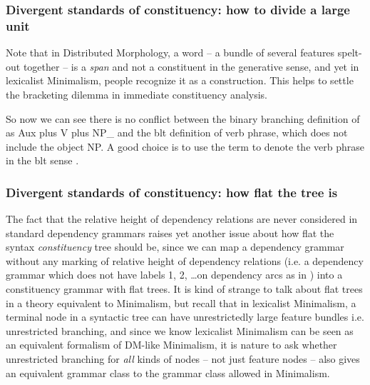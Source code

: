 \documentclass[../main.tex]{subfiles}
\begin{document}
\subsubsection{Divergent standards of constituency: how to divide a large unit}\label{sec:divergent-standard-constituency-segmentation}

Note that in Distributed Morphology, a word -- a bundle of several features spelt-out together -- 
is a \emph{span} and not a constituent in the generative sense, 
and yet in lexicalist Minimalism, people recognize it as a construction. 
This helps to settle the bracketing dilemma in immediate constituency analysis.

So now we can see there is no conflict 
between the binary branching definition of  as Aux plus V plus NP_{} 
and the \ac{blt} definition of verb phrase, which does not include the object NP. 
A good choice is to use the term  
to denote the verb phrase in the \ac{blt} sense \citep[among others]{Wilbur2014,Friesen2017}.

\subsubsection{Divergent standards of constituency: how flat the tree is}

The fact that the relative height of dependency relations are never considered 
in standard dependency grammars raises yet another issue about 
how flat the syntax \emph{constituency} tree should be,
since we can map a dependency grammar without any marking of relative height of dependency relations 
(i.e. a dependency grammar which does not have labels 1, 2, \dots on dependency arcs as in )
into a constituency grammar with flat trees. 
It is kind of strange to talk about flat trees in a theory equivalent to Minimalism, 
but recall that in lexicalist Minimalism, 
a terminal node in a syntactic tree can have unrestrictedly large feature bundles i.e. unrestricted branching, 
and since we know lexicalist Minimalism can be seen as an equivalent formalism of DM-like Minimalism, 
it is nature to ask whether unrestricted branching for \emph{all} kinds of nodes 
-- not just feature nodes -- also gives an equivalent grammar class to the grammar class allowed in Minimalism.
\end{document}
